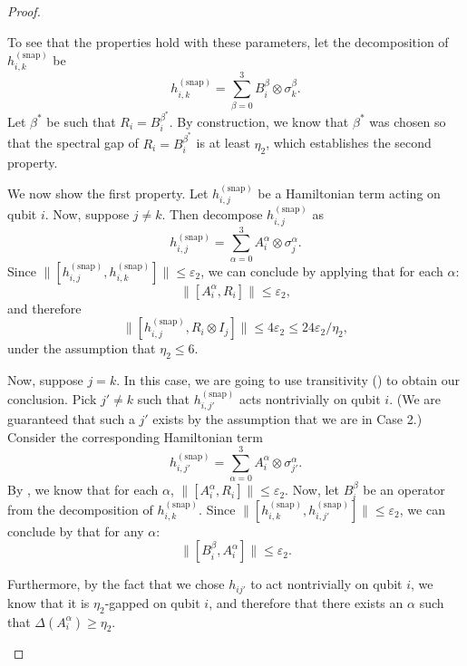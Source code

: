 \documentclass[11pt]{article}
\theoremstyle{plain}
\newcommand{\eps}{\varepsilon}
\newcommand{\snp}{{(\mathrm{snap})}}
\begin{document}
\begin{proof}
\begin{enumerate}
To see that the properties hold with these parameters, let the decomposition of $h^\snp_{i,k}$ be
\begin{equation}
    h^\snp_{i,k} = \sum_{\beta=0}^3 B_i^\beta \otimes \sigma_k^\beta.
\end{equation}
Let $\beta^*$ be such that $R_i = B_i^{\beta^*}$. By construction, we know that $\beta^*$ was chosen so that the spectral gap of  $R_i = B_i^{\beta^*}$ is at least $\eta_2$, which establishes the second property. 

We now show the first property. Let $h^\snp_{i,j}$ be a Hamiltonian term acting on qubit $i$. Now, suppose $j \neq k$. Then decompose $h^\snp_{i,j}$ as
\begin{equation}
    h^\snp_{i,j}  = \sum_{\alpha=0}^3 A_i^\alpha \otimes \sigma_j^\alpha. 
\end{equation}
Since $\|[h^\snp_{i,j},h^\snp_{i,k}]\| \leq \eps_2$, we can conclude by applying  that for each $\alpha$:
\begin{equation}
 \| [A_i^\alpha, R_i] \| \leq \eps_2, \label{eq:pivot-commutes-different-term-2}
\end{equation}
and therefore
\begin{equation}
    \| [h^\snp_{i,j}, R_i \otimes I_j ] \| \leq 4 \eps_2 \leq 24\eps_2/\eta_2,
\end{equation}
under the assumption that $\eta_2 \leq 6$.

Now, suppose $j = k$. In this case, we are going to use transitivity () to obtain our conclusion. Pick $j' \neq k$ such that $h^\snp_{i,j'}$ acts nontrivially on qubit $i$. (We are guaranteed that such a $j'$ exists by the assumption that we are in Case 2.) Consider the corresponding Hamiltonian term
\begin{equation}
    h^\snp_{i,j'} = \sum_{\alpha=0}^3 A_i^\alpha \otimes \sigma_{j'}^\alpha. 
\end{equation}
By , we know that for each $\alpha$, $\| [A_i^\alpha, R_i]\| \leq \eps_2.$ Now, let $B_i^\beta$ be an operator from the decomposition of $h^\snp_{i,k}$. Since $\| [h^\snp_{i,k}, h^\snp_{i,j'}] \| \leq \eps_2$, we can conclude by  that for any $\alpha$:
\begin{equation}
    \| [ B_i^\beta, A_i^\alpha] \| \leq \eps_2.
\end{equation}

Furthermore, by the fact that we chose $h_{ij'}$ to act nontrivially on qubit $i$, we know that it is $\eta_2$-gapped on qubit $i$, and therefore that there exists an $\alpha$ such that $\Delta(A_i^\alpha) \geq \eta_2$. 


\end{enumerate}
\end{proof}
\end{document}
